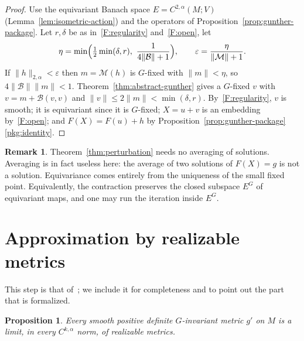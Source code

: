 \documentclass[11pt]{amsart}
\newtheorem{proposition}[theorem]{Proposition}
\theoremstyle{definition}
\newtheorem{remark}[theorem]{Remark}
\newcommand{\cM}{\mathcal{M}}
\newcommand{\cB}{\mathcal{B}}
\begin{document}
\begin{proof}
Use the equivariant Banach space $E=C^{2,\alpha}(M;V)$ (Lemma~\ref{lem:isometric-action}) and the
operators of Proposition~\ref{prop:gunther-package}. Let $r,\delta$ be as in~\ref{F:regularity}
and~\ref{F:open}, let
\[
\eta=\min\Bigl(\tfrac12\min(\delta,r),\ \frac1{4\|\cB\|+1}\Bigr),\qquad \varepsilon=\frac{\eta}{\|\cM\|+1}.
\]
If $\|h\|_{2,\alpha}<\varepsilon$ then $m=\cM(h)$ is $G$-fixed with $\|m\|<\eta$, so
$4\|\cB\|\|m\|<1$. Theorem~\ref{thm:abstract-gunther} gives a $G$-fixed $v$ with
$v=m+\cB(v,v)$ and $\|v\|\le2\|m\|<\min(\delta,r)$. By~\ref{F:regularity}, $v$ is smooth; it is
equivariant since it is $G$-fixed; $X=u+v$ is an embedding by~\ref{F:open}; and $F(X)=F(u)+h$ by
Proposition~\ref{prop:gunther-package}\ref{pkg:identity}.
\end{proof}

\begin{remark}
Theorem~\ref{thm:perturbation} needs no averaging of solutions. Averaging is in fact useless
here: the average of two solutions of $F(X)=g$ is not a solution. Equivariance comes entirely from
the uniqueness of the small fixed point. Equivalently, the contraction preserves the closed
subspace $E^G$ of equivariant maps, and one may run the iteration inside $E^G$.
\end{remark}

\section{Approximation by realizable metrics}\label{sec:approx}

This step is that of~\cite[\S3]{MS80}; we include it for completeness and to point out the part
that is formalized.

\begin{proposition}\label{prop:approx}
Every smooth positive definite $G$-invariant metric $g'$ on $M$ is a limit, in every
$C^{k,\alpha}$ norm, of realizable metrics.
\end{proposition}
\end{document}
